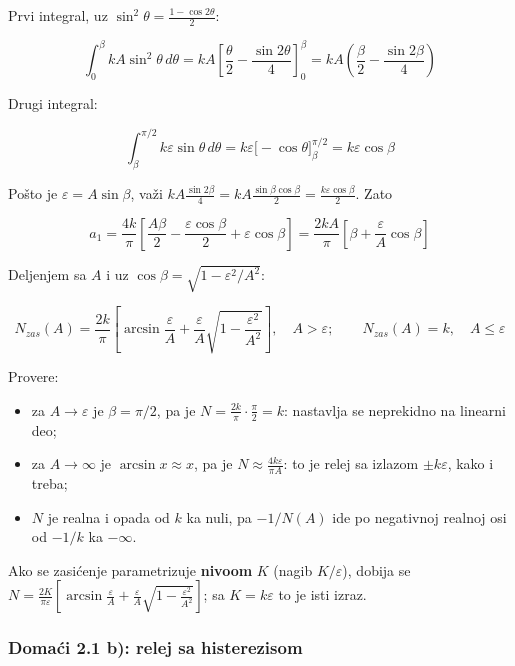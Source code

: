 \documentclass[11pt,a4paper,parskip=half,headsepline,numbers=noenddot]{scrartcl}
\begin{document}
Prvi integral, uz \(\sin^2\theta = \frac{1 - \cos2\theta}{2}\):

\[\int_0^\beta kA\sin^2\theta\,d\theta = kA\left[\frac{\theta}{2} - \frac{\sin2\theta}{4}\right]_0^\beta = kA\left(\frac{\beta}{2} - \frac{\sin2\beta}{4}\right)\]

Drugi integral:

\[\int_\beta^{\pi/2} k\varepsilon\sin\theta\,d\theta = k\varepsilon\big[-\cos\theta\big]_\beta^{\pi/2} = k\varepsilon\cos\beta\]

Pošto je \(\varepsilon = A\sin\beta\), važi \(kA\frac{\sin2\beta}{4} = kA\frac{\sin\beta\cos\beta}{2} = \frac{k\varepsilon\cos\beta}{2}\). Zato

\[a_1 = \frac{4k}{\pi}\left[\frac{A\beta}{2} - \frac{\varepsilon\cos\beta}{2} + \varepsilon\cos\beta\right] = \frac{2kA}{\pi}\left[\beta + \frac{\varepsilon}{A}\cos\beta\right]\]

Deljenjem sa \(A\) i uz \(\cos\beta = \sqrt{1 - \varepsilon^2/A^2}\):

\begin{kljucna}
\[N_{zas}(A) = \frac{2k}{\pi}\left[\arcsin\frac{\varepsilon}{A} + \frac{\varepsilon}{A}\sqrt{1 - \frac{\varepsilon^2}{A^2}}\right], \quad A > \varepsilon; \qquad N_{zas}(A) = k, \quad A \le \varepsilon\]
\end{kljucna}

Provere:

\begin{itemize}
\item za \(A \to \varepsilon\) je \(\beta = \pi/2\), pa je \(N = \frac{2k}{\pi}\cdot\frac{\pi}{2} = k\): nastavlja se neprekidno na linearni deo;
\item za \(A \to \infty\) je \(\arcsin x \approx x\), pa je \(N \approx \frac{4k\varepsilon}{\pi A}\): to je relej sa izlazom \(\pm k\varepsilon\), kako i treba;
\item \(N\) je realna i opada od \(k\) ka nuli, pa \(-1/N(A)\) ide po negativnoj realnoj osi od \(-1/k\) ka \(-\infty\).
\end{itemize}

Ako se zasićenje parametrizuje \textbf{nivoom} \(K\) (nagib \(K/\varepsilon\)), dobija se \(N = \frac{2K}{\pi\varepsilon}\left[\arcsin\frac{\varepsilon}{A} + \frac{\varepsilon}{A}\sqrt{1 - \frac{\varepsilon^2}{A^2}}\right]\); sa \(K = k\varepsilon\) to je isti izraz.

\subsubsection{Domaći 2.1 b): relej sa histerezisom}
\end{document}
